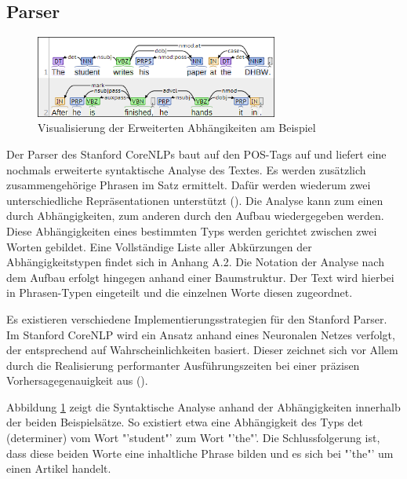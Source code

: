 \subsection{Parser}
\label{subsec:parser}
\begin{figure}
\includegraphics[width=8cm]{pictures/Parser.png}
\caption{Visualisierung der Erweiterten Abhängikeiten am Beispiel}
\label{fig:ENHDEPS}
\end{figure}
Der Parser des Stanford CoreNLPs baut auf den POS-Tags auf und liefert eine nochmals erweiterte syntaktische Analyse des Textes. Es werden zusätzlich zusammengehörige Phrasen im Satz ermittelt. Dafür werden wiederum zwei unterschiedliche Repräsentationen unterstützt (\cite[vgl.][4]{STANFORDNLP}). Die Analyse kann zum einen durch Abhängigkeiten, zum anderen durch den Aufbau wiedergegeben werden. Diese Abhängigkeiten eines bestimmten Typs werden gerichtet zwischen zwei Worten gebildet. Eine Vollständige Liste aller Abkürzungen der Abhängigkeitstypen findet sich in Anhang A.2. Die Notation der Analyse nach dem Aufbau erfolgt hingegen anhand einer Baumstruktur. Der Text wird hierbei in Phrasen-Typen eingeteilt und die einzelnen Worte diesen zugeordnet.\par Es existieren verschiedene Implementierungsstrategien für den Stanford Parser. Im Stanford CoreNLP wird ein Ansatz anhand eines Neuronalen Netzes verfolgt, der entsprechend auf Wahrscheinlichkeiten basiert. Dieser zeichnet sich vor Allem durch die Realisierung performanter Ausführungszeiten bei einer präzisen Vorhersagegenauigkeit aus (\cite[vgl.][8]{DEPPARSER}).\par
Abbildung \ref{fig:ENHDEPS} zeigt die Syntaktische Analyse anhand der Abhängigkeiten innerhalb der beiden Beispielsätze. So existiert etwa eine Abhängigkeit des Typs det (determiner) vom Wort "'student"' zum Wort "'the"'. Die Schlussfolgerung ist, dass diese beiden Worte eine inhaltliche Phrase bilden und es sich bei "'the"' um einen Artikel handelt.

